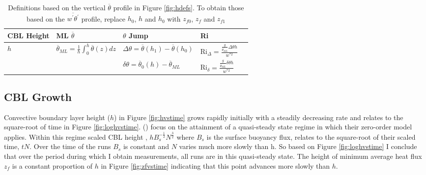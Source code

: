 \begin{table}[htbp]
    \begin{center}
    \begin{tabular}{ p{2cm} p{3.5cm}  p{3.5cm}  p{3cm} p{3cm} }
      \acs{CBL} Height & \acs{ML} $\overline{\theta}$ & $\theta$ Jump & \acs{Ri} \\ \hline 
       $h$ & $\overline{\theta}_{ML} = \frac{1}{h}\int^{h}_{0}\overline{\theta}(z)dz$ & $\Delta \theta=\overline{\theta}(h_{1})-\overline{\theta}(h_{0})$ & \acs{Ri}$_{\Delta}=\frac{\frac{g}{\overline{\theta}_{ML}}\Delta \theta h}{w^{*2}}$  \\ [.3cm] %
        
       & &$\delta \theta = \overline{\theta}_{0}(h)- \overline{\theta}_{ML}$ & \acs{Ri}$_{\delta}=\frac{\frac{g}{\overline{\theta}_{ML}} \delta \theta h}{w^{*2}}$ \\ \hline
      \end{tabular}
\caption[Height definitions]{Definitions based on the vertical $\overline{\theta}$ profile in Figure \ref{fig:hdefs}.  To obtain those based on the $\overline{w^{'}\theta^{'}}$ profile, replace $h_{0}$, $h$ and $h_{0}$ with $z_{f0}$, $z_{f}$ and $z_{f1}$}
\label{table:reldefs}   
\end{center}    
\end{table}

\subsection{\acs{CBL} Growth}

Convective boundary layer height ($h$) in Figure \ref{fig:hvstime} grows rapidly initially with a steadily decreasing rate and relates to the square-root of time in Figure \ref{fig:loghvstime}.  \citeauthor{FedConzMir04} (\citeyear{FedConzMir04})
focus on the attainment of a quasi-steady state regime in which their zero-order model applies.  Within this regime scaled \acs{CBL} height , $hB_{s}^{-\frac{1}{2}}N^{\frac{3}{2}}$ where $B_{s}$ is the surface buoyancy flux, relates to the square-root of their scaled time, $tN$. Over the time of the runs $B_{s}$ is constant and $N$ varies much more slowly than h.  So based on Figure \ref{fig:loghvstime} I conclude that over the period during which I obtain measurements, all runs are in this quasi-steady state. The height of minimum average heat flux $z_{f}$ is a constant proportion of $h$ in Figure \ref{fig:zfvstime} indicating that this point advances more slowly than $h$.\\
  

